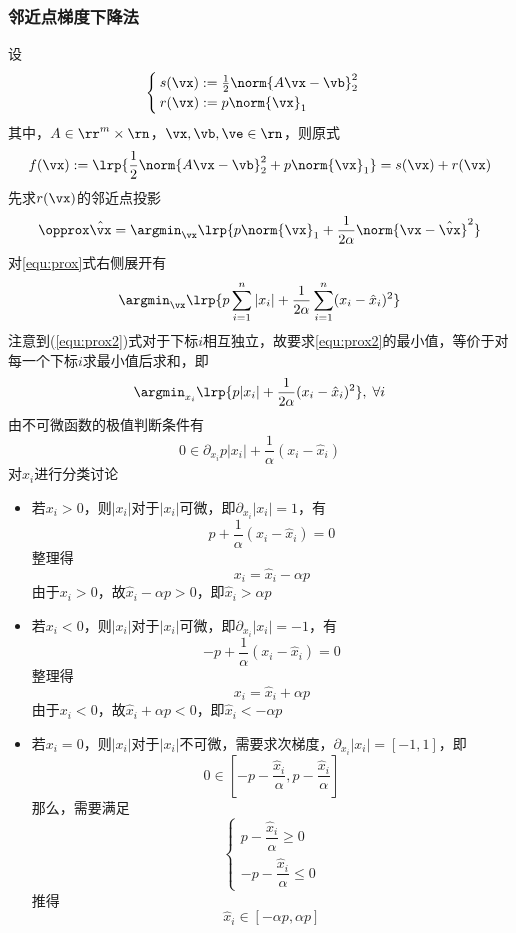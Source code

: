 \documentclass[logo,reportComp]{thesis}
\begin{document}
\subsubsection{邻近点梯度下降法}
设
\[\begin{cases}
s(\vx):=\frac{1}{2}\norm{A\vx-\vb}_2^2\\
r(\vx):=p\norm{\vx}_1
\end{cases}\]
其中，$A\in\rr^m\times\rn$，$\vx,\vb,\ve\in\rn$，则原式
\[f(\vx):=\lrp{\frac{1}{2}\norm{A\vx-\vb}_2^2+p\norm{\vx}_1}=s(\vx)+r(\vx)\]
先求$r(\vx)$的邻近点投影
\begin{equation}
\label{equ:prox}
\opprox \hat{\vx}=\argmin_\vx\lrp{p\norm{\vx}_1+\frac{1}{2\alpha}\norm{\vx-\hat{\vx}}^2}
\end{equation}
对\ref{equ:prox}式右侧展开有
\begin{equation}
\label{equ:prox2}
\argmin_\vx\lrp{p\sum_{i=1}^n|x_i|+\frac{1}{2\alpha}\sum_{i=1}^n(x_i-\hat{x}_i)^2}
\end{equation}
注意到(\ref{equ:prox2})式对于下标$i$相互独立，故要求\ref{equ:prox2}的最小值，等价于对每一个下标$i$求最小值后求和，即
\begin{equation}
\label{equ:prox3}
\argmin_{x_i}\lrp{p|x_i|+\frac{1}{2\alpha}(x_i-\hat{x}_i)^2},\;\forall i
\end{equation}
由不可微函数的极值判断条件有
\begin{equation}
0\in\partial_{x_i}p|x_i|+\frac{1}{\alpha}(x_i-\hat{x}_i)
\end{equation}
对$x_i$进行分类讨论
\begin{itemize}
	\item 若$x_i>0$，则$|x_i|$对于$|x_i|$可微，即$\partial_{x_i}|x_i|=1$，有
	\[p+\frac{1}{\alpha}(x_i-\hat{x}_i)=0\]
	整理得
	\[x_i=\hat{x}_i-\alpha p\]
	由于$x_i>0$，故$\hat{x}_i-\alpha p>0$，即$\hat{x}_i>\alpha p$
	\item 若$x_i<0$，则$|x_i|$对于$|x_i|$可微，即$\partial_{x_i}|x_i|=-1$，有
	\[-p+\frac{1}{\alpha}(x_i-\hat{x}_i)=0\]
	整理得
	\[x_i=\hat{x}_i+\alpha p\]
	由于$x_i<0$，故$\hat{x}_i+\alpha p<0$，即$\hat{x}_i<-\alpha p$
	\item 若$x_i=0$，则$|x_i|$对于$|x_i|$不可微，需要求次梯度，$\partial_{x_i}|x_i|=[-1,1]$，即
	\[0\in\left[-p-\frac{\hat{x}_i}{\alpha},p-\frac{\hat{x}_i}{\alpha}\right]\]
	那么，需要满足
	\[\begin{cases}
	p-\dfrac{\hat{x}_i}{\alpha}\geq 0\\
	-p-\dfrac{\hat{x}_i}{\alpha}\leq 0
	\end{cases}\]
	推得
	\[\hat{x}_i\in[-\alpha p,\alpha p]\]
\end{itemize}
\end{document}

